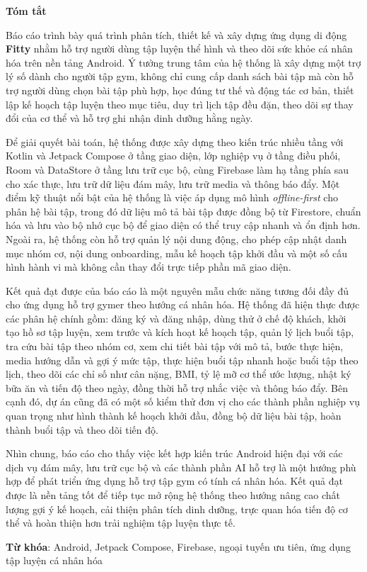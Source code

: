 \begin{center}
\textbf{\large{Tóm tắt}}
\end{center}


\begin{small}

Báo cáo trình bày quá trình phân tích, thiết kế và xây dựng ứng dụng di động \textbf{Fitty} nhằm hỗ trợ người dùng tập luyện thể hình và theo dõi sức khỏe cá nhân hóa trên nền tảng Android. Ý tưởng trung tâm của hệ thống là xây dựng một trợ lý số dành cho người tập gym, không chỉ cung cấp danh sách bài tập mà còn hỗ trợ người dùng chọn bài tập phù hợp, học đúng tư thế và động tác cơ bản, thiết lập kế hoạch tập luyện theo mục tiêu, duy trì lịch tập đều đặn, theo dõi sự thay đổi của cơ thể và hỗ trợ ghi nhận dinh dưỡng hằng ngày.

Để giải quyết bài toán, hệ thống được xây dựng theo kiến trúc nhiều tầng với Kotlin và Jetpack Compose ở tầng giao diện, lớp nghiệp vụ ở tầng điều phối, Room và DataStore ở tầng lưu trữ cục bộ, cùng Firebase làm hạ tầng phía sau cho xác thực, lưu trữ dữ liệu đám mây, lưu trữ media và thông báo đẩy. Một điểm kỹ thuật nổi bật của hệ thống là việc áp dụng mô hình \textit{offline-first} cho phân hệ bài tập, trong đó dữ liệu mô tả bài tập được đồng bộ từ Firestore, chuẩn hóa và lưu vào bộ nhớ cục bộ để giao diện có thể truy cập nhanh và ổn định hơn. Ngoài ra, hệ thống còn hỗ trợ quản lý nội dung động, cho phép cập nhật danh mục nhóm cơ, nội dung onboarding, mẫu kế hoạch tập khởi đầu và một số cấu hình hành vi mà không cần thay đổi trực tiếp phần mã giao diện.

Kết quả đạt được của báo cáo là một nguyên mẫu chức năng tương đối đầy đủ cho ứng dụng hỗ trợ gymer theo hướng cá nhân hóa. Hệ thống đã hiện thực được các phân hệ chính gồm: đăng ký và đăng nhập, dùng thử ở chế độ khách, khởi tạo hồ sơ tập luyện, xem trước và kích hoạt kế hoạch tập, quản lý lịch buổi tập, tra cứu bài tập theo nhóm cơ, xem chi tiết bài tập với mô tả, bước thực hiện, media hướng dẫn và gợi ý mức tập, thực hiện buổi tập nhanh hoặc buổi tập theo lịch, theo dõi các chỉ số như cân nặng, BMI, tỷ lệ mỡ cơ thể ước lượng, nhật ký bữa ăn và tiến độ theo ngày, đồng thời hỗ trợ nhắc việc và thông báo đẩy. Bên cạnh đó, dự án cũng đã có một số kiểm thử đơn vị cho các thành phần nghiệp vụ quan trọng như hình thành kế hoạch khởi đầu, đồng bộ dữ liệu bài tập, hoàn thành buổi tập và theo dõi tiến độ.

Nhìn chung, báo cáo cho thấy việc kết hợp kiến trúc Android hiện đại với các dịch vụ đám mây, lưu trữ cục bộ và các thành phần AI hỗ trợ là một hướng phù hợp để phát triển ứng dụng hỗ trợ tập gym có tính cá nhân hóa. Kết quả đạt được là nền tảng tốt để tiếp tục mở rộng hệ thống theo hướng nâng cao chất lượng gợi ý kế hoạch, cải thiện phân tích dinh dưỡng, trực quan hóa tiến độ cơ thể và hoàn thiện hơn trải nghiệm tập luyện thực tế.

\vspace*{1cm}
\textbf{Từ khóa}: Android, Jetpack Compose, Firebase, ngoại tuyến ưu tiên, ứng dụng tập luyện cá nhân hóa

\end{small}
